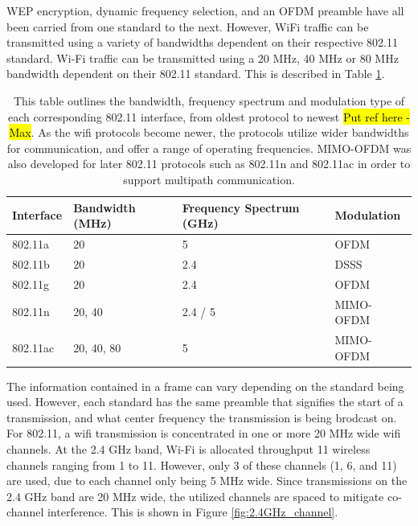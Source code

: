 WEP encryption, dynamic frequency selection, and an OFDM preamble have all been carried from one standard to the next. However, WiFi traffic can be transmitted using a variety of bandwidths dependent on their respective 802.11 standard. Wi-Fi traffic can be transmitted using a 20 MHz, 40 MHz or 80 MHz bandwidth dependent on their 802.11 standard. This is described in Table \ref{table:wifi_protocols}. 
\begin{table}[ht]
\centering
\caption{This table outlines the bandwidth, frequency spectrum and modulation type of each corresponding 802.11 interface, from oldest protocol to newest \hl{Put ref here - Max}. As the wifi protocols become newer, the protocols utilize wider bandwidths for communication, and offer a range of operating frequencies. MIMO-OFDM was also developed for later 802.11 protocols such as 802.11n and 802.11ac in order to support multipath communication.}
\label{table:wifi_protocols}
\begin{tabular}{|l|l|l|l|} %
  \hline
  Interface & Bandwidth (MHz) & Frequency Spectrum (GHz) & Modulation \\ \hline
          802.11a &              20 &                  5 &       OFDM \\
          802.11b &              20 &                2.4 &       DSSS \\
          802.11g &              20 &                2.4 &       OFDM \\
          802.11n &          20, 40 &            2.4 / 5 &  MIMO-OFDM \\
         802.11ac &      20, 40, 80 &                  5 &  MIMO-OFDM \\ \hline
\end{tabular}
\end{table}\par
The information contained in a frame can vary depending on the standard being used. However, each standard has the same preamble that signifies the start of a transmission, and what center frequency the transmission is being brodcast on.  For 802.11, a wifi transmission is concentrated in one or more 20 MHz wide wifi channels. At the 2.4 GHz band, Wi-Fi is allocated throughput 11 wireless channels ranging from 1 to 11.  However, only 3 of these channels (1, 6, and 11) are used, due to each channel only being 5 MHz wide.  Since transmissions on the 2.4 GHz band are 20 MHz wide, the utilized channels are spaced to mitigate co-channel interference. This is shown in Figure \ref{fig:2.4GHz_channel}.
